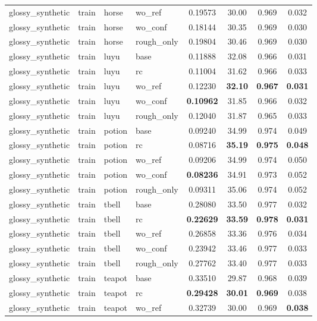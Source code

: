\begin{table}[t]
{\begin{tabular}{llllcccc}
glossy\_synthetic & train & horse & wo\_ref & 0.19573 & 30.00 & 0.969 & 0.032 \\
glossy\_synthetic & train & horse & wo\_conf & 0.18144 & 30.35 & 0.969 & 0.030 \\
glossy\_synthetic & train & horse & rough\_only & 0.19804 & 30.46 & 0.969 & 0.030 \\
glossy\_synthetic & train & luyu & base & 0.11888 & 32.08 & 0.966 & 0.031 \\
glossy\_synthetic & train & luyu & rc & 0.11004 & 31.62 & 0.966 & 0.033 \\
glossy\_synthetic & train & luyu & wo\_ref & 0.12230 & \textbf{32.10} & \textbf{0.967} & \textbf{0.031} \\
glossy\_synthetic & train & luyu & wo\_conf & \textbf{0.10962} & 31.85 & 0.966 & 0.032 \\
glossy\_synthetic & train & luyu & rough\_only & 0.12040 & 31.87 & 0.965 & 0.033 \\
glossy\_synthetic & train & potion & base & 0.09240 & 34.99 & 0.974 & 0.049 \\
glossy\_synthetic & train & potion & rc & 0.08716 & \textbf{35.19} & \textbf{0.975} & \textbf{0.048} \\
glossy\_synthetic & train & potion & wo\_ref & 0.09206 & 34.99 & 0.974 & 0.050 \\
glossy\_synthetic & train & potion & wo\_conf & \textbf{0.08236} & 34.91 & 0.973 & 0.052 \\
glossy\_synthetic & train & potion & rough\_only & 0.09311 & 35.06 & 0.974 & 0.052 \\
glossy\_synthetic & train & tbell & base & 0.28080 & 33.50 & 0.977 & 0.032 \\
glossy\_synthetic & train & tbell & rc & \textbf{0.22629} & \textbf{33.59} & \textbf{0.978} & \textbf{0.031} \\
glossy\_synthetic & train & tbell & wo\_ref & 0.26858 & 33.36 & 0.976 & 0.034 \\
glossy\_synthetic & train & tbell & wo\_conf & 0.23942 & 33.46 & 0.977 & 0.033 \\
glossy\_synthetic & train & tbell & rough\_only & 0.27762 & 33.40 & 0.977 & 0.033 \\
glossy\_synthetic & train & teapot & base & 0.33510 & 29.87 & 0.968 & 0.039 \\
glossy\_synthetic & train & teapot & rc & \textbf{0.29428} & \textbf{30.01} & \textbf{0.969} & 0.038 \\
glossy\_synthetic & train & teapot & wo\_ref & 0.32739 & 30.00 & 0.969 & \textbf{0.038} \\

\end{tabular}}
\end{table}
